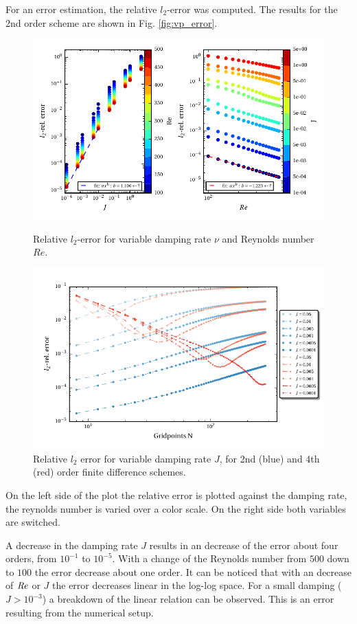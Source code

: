For an error estimation, the relative $l_2$-error was computed.
The results for the 2nd order scheme are shown in Fig. \ref{fig:vp_error}.
\begin{figure}[!b]
  \centering
  \includegraphics{gfx/immersed_boundary/poiseuille_flow/2_vp/vp_error.pdf}  \caption{\label{fig:vp_error}
    Relative $l_2$-error for variable damping rate $\nu$ and Reynolds number $Re$.}
  \centering
  \includegraphics{gfx/immersed_boundary/poiseuille_flow/2_vp/vp_convergence.pdf}
  \caption{\label{fig:vp_conv}
      Relative $l_2$ error for variable damping rate $J$, for 2nd (blue) and 4th (red) order finite difference schemes.}
\end{figure}

On the left side of the plot the relative error is plotted against the damping rate, the reynolds number is
varied over a color scale. On the right side both variables are switched.

A decrease in the damping rate $J$ results in an decrease of the error about four orders, from $10^{-1}$ to $10^{-5}$.
With a change of the Reynolds number from $500$ down to $100$ the error decrease about one order.
It can be noticed that with an decrease of $\mbox{\textit{Re}}$ or $J$ the error decreases linear in the log-log space.
For a small damping ($J>10^{-3}$) a breakdown of the linear relation can be observed.
This is an error resulting from the numerical setup.
\clearpage

